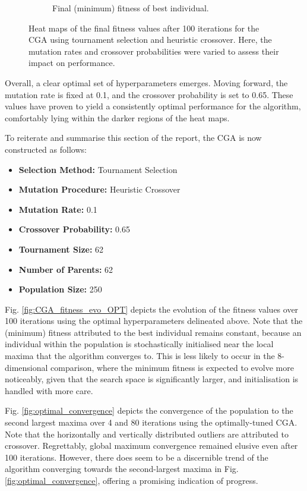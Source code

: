 \documentclass[10pt]{article}
\begin{document}
\begin{multicols}{2}
\begin{figure}[H]
\begin{subfigure}{0.48\textwidth}
        \caption{Final (minimum) fitness of best individual.}
        \label{fig:CGA_contour_tournament_Heuristic Crossover_MIN}
    \end{subfigure}
    \captionsetup{justification=centering}
    \caption{Heat maps of the final fitness values after 100 iterations for the CGA using tournament selection and heuristic crossover. Here, the mutation rates and crossover probabilities were varied to assess their impact on performance.}
    \label{fig:CGA_contour_rates}
\end{figure}

Overall, a clear optimal set of hyperparameters emerges. Moving forward, the mutation rate is fixed at 0.1, and the crossover probability is set to 0.65. These values have proven to yield a consistently optimal performance for the algorithm, comfortably lying within the darker regions of the heat maps.

To reiterate and summarise this section of the report, the CGA is now constructed as follows:

\begin{itemize}
    \item \textbf{Selection Method:} Tournament Selection
    \item \textbf{Mutation Procedure:} Heuristic Crossover
    \item \textbf{Mutation Rate:} 0.1
    \item \textbf{Crossover Probability:} 0.65
    \item \textbf{Tournament Size:} 62
    \item \textbf{Number of Parents:} 62
    \item \textbf{Population Size:} 250
\end{itemize}

Fig. \ref{fig:CGA_fitness_evo_OPT} depicts the evolution of the fitness values over 100 iterations using the optimal hyperparameters delineated above. Note that the (minimum) fitness attributed to the best individual remains constant, because an individual within the population is stochastically initialised near the local maxima that the algorithm converges to. This is less likely to occur in the 8-dimensional comparison, where the minimum fitness is expected to evolve more noticeably,  given that the search space is significantly larger, and initialisation is handled with more care.

Fig. \ref{fig:optimal_convergence} depicts the convergence of the population to the second largest maxima over 4 and 80 iterations using the optimally-tuned CGA. Note that the horizontally and vertically distributed outliers are attributed to crossover. Regrettably, global maximum convergence remained elusive even after 100 iterations. However, there does seem to be a discernible trend of the algorithm converging towards the second-largest maxima in Fig. \ref{fig:optimal_convergence}, offering a promising indication of progress. 


\end{multicols}
\end{document}
